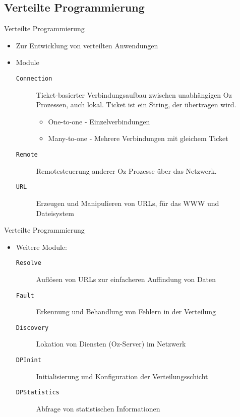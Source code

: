 \subsection{Verteilte Programmierung}
\begin{frame}{Verteilte Programmierung}
  \begin{itemize}
    \item Zur Entwicklung von verteilten Anwendungen
    \item Module
    \begin{description}
      \item[\texttt{Connection}] Ticket-basierter Verbindungsaufbau zwischen unabhängigen Oz
      Prozessen, auch lokal. Ticket ist ein String, der übertragen wird.
      \begin{itemize}
        \item One-to-one - Einzelverbindungen
        \item Many-to-one - Mehrere Verbindungen mit gleichem Ticket
      \end{itemize}
      \item[\texttt{Remote}] Remotesteuerung anderer Oz Prozesse über das
      Netzwerk. 
      \item[\texttt{URL}] Erzeugen und Manipulieren von URLs, für das WWW und
      Dateisystem
    \end{description}
  \end{itemize}
\end{frame} 

\begin{frame}{Verteilte Programmierung}
  \begin{itemize}
    \item Weitere Module:
    \begin{description}
      \item[\texttt{Resolve}] Auflösen von URLs zur einfacheren Auffindung von Daten
      \item[\texttt{Fault}] Erkennung und Behandlung von Fehlern in der Verteilung
      \item[\texttt{Discovery}] Lokation von Diensten (Oz-Server) im Netzwerk
      \item[\texttt{DPInint}] Initialisierung und Konfiguration der Verteilungsschicht
      \item[\texttt{DPStatistics}] Abfrage von statistischen Informationen
    \end{description}
  \end{itemize}
\end{frame}

